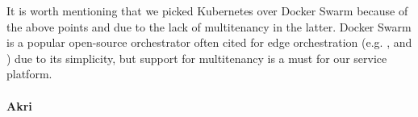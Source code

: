


It is worth mentioning that we picked Kubernetes over Docker Swarm \cite{docker-swarm} because of the above points and due to the lack of multitenancy in the latter. Docker Swarm is a popular open-source orchestrator often cited for edge orchestration (e.g. \cite{bellavista2017feasibility}, and \cite{ismail2015evaluation}) due to its simplicity, but support for multitenancy is a must for our service platform.

\paragraph{Akri}\label{p:akri}

